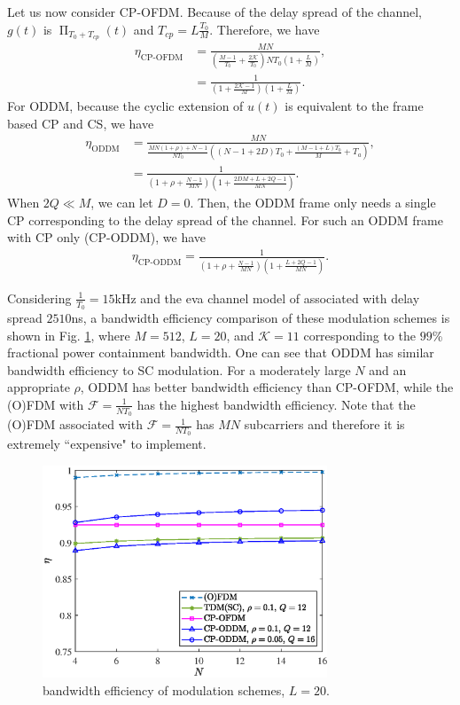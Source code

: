 \documentclass[journal]{IEEEtran}
\DeclareMathOperator{\rect}{\Pi}
\begin{document}
Let us now consider CP-OFDM. Because of the delay spread of the channel, $g(t)$ is $\rect_{T_0+T_{cp}}(t)$ and $T_{cp}=L\frac{T_0}{M}$. Therefore, we have
\begin{align}
  \eta_{\textrm{CP-OFDM}} & =\frac{MN}{(\frac{M-1}{T_0}+\frac{2\mathcal K}{T_0})NT_0(1+\frac{L}{M})},\nonumber \\
                          & =\frac{1}{(1+\frac{2\mathcal K-1}{M})(1+\frac{L}{M})}.
\end{align}
For ODDM, because the cyclic extension of $u(t)$ is equivalent to the frame based CP and CS, we have
\begin{align}
  \eta_{\textrm{ODDM}} & =\frac{MN}{\frac{MN(1+\rho)+N-1}{NT_0}((N-1+2D)T_0+\frac{(M-1+L)T_0}{M}+T_a)}, \nonumber \\
                       & =\frac{1}{(1+\rho+\frac{N-1}{MN})(1+\frac{2DM+L+2Q-1}{MN})}.
\end{align}
When $2Q\ll M$, we can let $D=0$. Then, the ODDM frame only needs a single CP corresponding to the delay spread of the channel. For such an ODDM frame with CP only (CP-ODDM), we have
\begin{align}
  \eta_{\textrm{CP-ODDM}} %
  =\frac{1}{(1+\rho+\frac{N-1}{MN})(1+\frac{L+2Q-1}{MN})}.
\end{align}

Considering $\frac{1}{T_0}=15$kHz and the \ac{eva} channel model of \cite{eva_channel_model} associated with delay spread $2510$ns, a bandwidth efficiency comparison of these modulation schemes is shown in Fig. \ref{secomp}, where $M=512$, $L=20$, and $\mathcal K=11$ corresponding to the $99$\% fractional power containment bandwidth.  One can see that  ODDM has similar bandwidth efficiency to SC modulation. {For a moderately large $N$ and an appropriate $\rho$}, ODDM has better bandwidth efficiency than CP-OFDM, while the (O)FDM with $\mathcal F=\frac{1}{NT_0}$ has the highest bandwidth efficiency. Note that the (O)FDM associated with $\mathcal F=\frac{1}{NT_0}$ has $MN$ subcarriers and therefore it is extremely ``expensive" to implement.

\setcounter{figure}{14}
\begin{figure}
  \centering
  \includegraphics[width=8.5cm]{se_comparison}
  \caption{bandwidth efficiency of modulation schemes, $L=20$.}
  \label{secomp}
\end{figure}
\setcounter{figure}{16}
\end{document}

